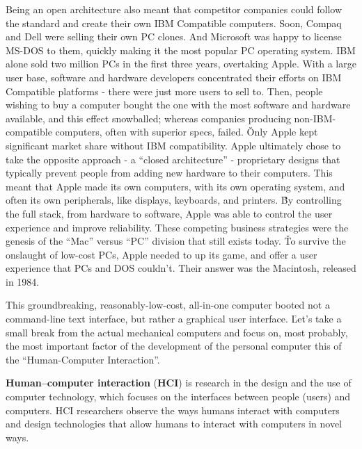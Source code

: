 Being an open architecture also meant that competitor companies could follow the standard and create their own IBM
Compatible computers. Soon, Compaq and Dell were selling their own PC clones. And Microsoft was happy to license
MS-DOS to them, quickly making it the most popular PC operating system. IBM alone sold two million PCs in the first
three years, overtaking Apple. With a large user base, software and hardware developers concentrated their efforts on
IBM Compatible platforms - there were just more users to sell to. Then, people wishing to buy a computer bought the
one with the most software and hardware available, and this effect snowballed; whereas companies producing
non-IBM-compatible computers, often with superior specs, failed. \v

Only Apple kept significant market share without IBM compatibility. Apple ultimately chose to take the opposite
approach - a ``closed architecture'' - proprietary designs that typically prevent people from adding new hardware to
their computers. This meant that Apple made its own computers, with its own operating system, and often its own
peripherals, like displays, keyboards, and printers. \v

By controlling the full stack, from hardware to software, Apple was able to control the user experience and improve
reliability. These competing business strategies were the genesis of the ``Mac'' versus ``PC'' division that still
exists today. \v

To survive the onslaught of low-cost PCs, Apple needed to up its game, and offer a user experience that PCs and DOS
couldn't. Their answer was the Macintosh, released in 1984.


This groundbreaking, reasonably-low-cost, all-in-one computer booted not a command-line text interface, but rather a
graphical user interface. \v

Let's take a small break from the actual mechanical computers and focus on, most probably, the most important factor
of the development of the personal computer this of the ``Human-Computer Interaction''.

\textbf{Human–computer interaction} (\textbf{HCI}) is research in the design and the use of computer technology,
which focuses on the interfaces between people (users) and computers. HCI researchers observe the ways humans
interact with computers and design technologies that allow humans to interact with computers in novel ways.
\ed

